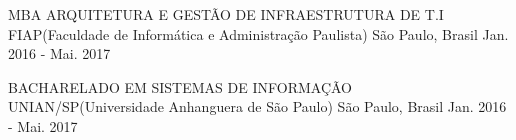 

\begin{cventries}

  \cventry
    {MBA ARQUITETURA E GESTÃO DE INFRAESTRUTURA DE T.I} %
    {FIAP(Faculdade de Informática e Administração Paulista)} %
    {São Paulo, Brasil} %
    {Jan. 2016 - Mai. 2017} %
  
  \cventry
    {BACHARELADO EM SISTEMAS DE INFORMAÇÃO} %
    {UNIAN/SP(Universidade Anhanguera de São Paulo)} %
    {São Paulo, Brasil} %
    {Jan. 2016 - Mai. 2017} %

\end{cventries}
